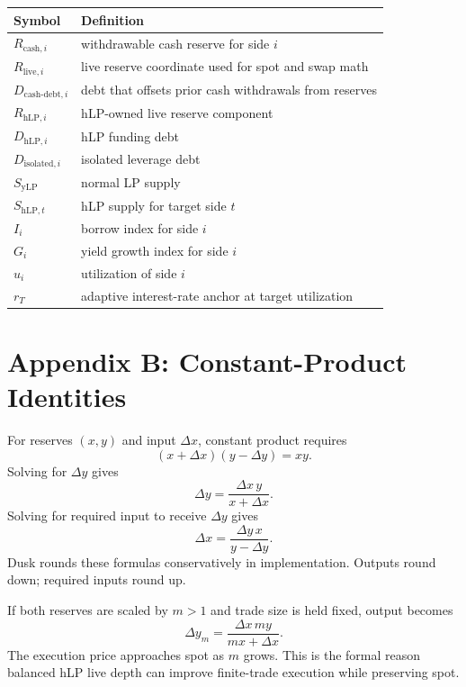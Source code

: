\documentclass[11pt]{article}
\newcommand{\cash}{\mathrm{cash}}
\newcommand{\live}{\mathrm{live}}
\newcommand{\hlp}{\mathrm{hLP}}
\newcommand{\ylp}{\mathrm{yLP}}
\newcommand{\debt}{\mathrm{debt}}
\begin{document}
\begin{center}
\begin{tabular}{ll}
\toprule
Symbol & Definition \\
\midrule
$R_{\cash,i}$ & withdrawable cash reserve for side $i$ \\
$R_{\live,i}$ & live reserve coordinate used for spot and swap math \\
$D_{\cash\text{-}\debt,i}$ & debt that offsets prior cash withdrawals from reserves \\
$R_{\hlp,i}$ & hLP-owned live reserve component \\
$D_{\hlp,i}$ & hLP funding debt \\
$D_{\mathrm{isolated},i}$ & isolated leverage debt \\
$S_{\ylp}$ & normal LP supply \\
$S_{\hlp,t}$ & hLP supply for target side $t$ \\
$I_i$ & borrow index for side $i$ \\
$G_i$ & yield growth index for side $i$ \\
$u_i$ & utilization of side $i$ \\
$r_T$ & adaptive interest-rate anchor at target utilization \\
\bottomrule
\end{tabular}
\end{center}

\section{Appendix B: Constant-Product Identities}

For reserves $(x,y)$ and input $\Delta x$, constant product requires
\begin{equation}
(x+\Delta x)(y-\Delta y)=xy.
\end{equation}
Solving for $\Delta y$ gives
\begin{equation}
\Delta y=\frac{\Delta x\,y}{x+\Delta x}.
\end{equation}
Solving for required input to receive $\Delta y$ gives
\begin{equation}
\Delta x=\frac{\Delta y\,x}{y-\Delta y}.
\end{equation}
Dusk rounds these formulas conservatively in implementation. Outputs round down; required inputs round up.

If both reserves are scaled by $m>1$ and trade size is held fixed, output becomes
\begin{equation}
\Delta y_m=\frac{\Delta x\,my}{mx+\Delta x}.
\end{equation}
The execution price approaches spot as $m$ grows. This is the formal reason balanced hLP live depth can improve finite-trade execution while preserving spot.
\end{document}
